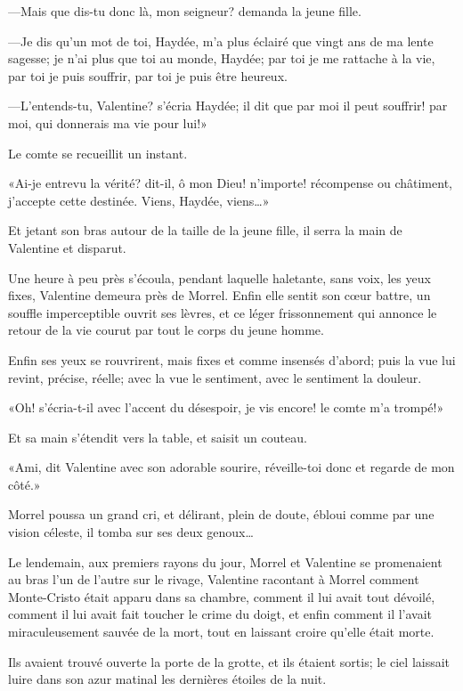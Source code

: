 —Mais que dis-tu donc là, mon seigneur? demanda la jeune fille. 

—Je dis qu'un mot de toi, Haydée, m'a plus éclairé que vingt ans de ma lente sagesse; je n'ai plus que toi au monde, Haydée; par toi je me rattache à la vie, par toi je puis souffrir, par toi je puis être heureux. 

—L'entends-tu, Valentine? s'écria Haydée; il dit que par moi il peut souffrir! par moi, qui donnerais ma vie pour lui!» 

Le comte se recueillit un instant. 

«Ai-je entrevu la vérité? dit-il, ô mon Dieu! n'importe! récompense ou châtiment, j'accepte cette destinée. Viens, Haydée, viens\dots» 

Et jetant son bras autour de la taille de la jeune fille, il serra la main de Valentine et disparut. 

Une heure à peu près s'écoula, pendant laquelle haletante, sans voix, les yeux fixes, Valentine demeura près de Morrel. Enfin elle sentit son cœur battre, un souffle imperceptible ouvrit ses lèvres, et ce léger frissonnement qui annonce le retour de la vie courut par tout le corps du jeune homme. 

Enfin ses yeux se rouvrirent, mais fixes et comme insensés d'abord; puis la vue lui revint, précise, réelle; avec la vue le sentiment, avec le sentiment la douleur. 

«Oh! s'écria-t-il avec l'accent du désespoir, je vis encore! le comte m'a trompé!» 

Et sa main s'étendit vers la table, et saisit un couteau. 

«Ami, dit Valentine avec son adorable sourire, réveille-toi donc et regarde de mon côté.» 

Morrel poussa un grand cri, et délirant, plein de doute, ébloui comme par une vision céleste, il tomba sur ses deux genoux\dots 

Le lendemain, aux premiers rayons du jour, Morrel et Valentine se promenaient au bras l'un de l'autre sur le rivage, Valentine racontant à Morrel comment Monte-Cristo était apparu dans sa chambre, comment il lui avait tout dévoilé, comment il lui avait fait toucher le crime du doigt, et enfin comment il l'avait miraculeusement sauvée de la mort, tout en laissant croire qu'elle était morte. 

Ils avaient trouvé ouverte la porte de la grotte, et ils étaient sortis; le ciel laissait luire dans son azur matinal les dernières étoiles de la nuit. 

